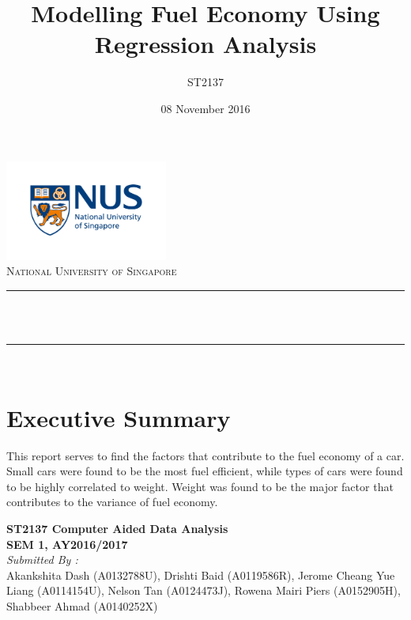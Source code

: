 \documentclass[12pt]{article}
\title{Modelling Fuel Economy Using Regression Analysis}					%
\author{ST2137}							%
\date{08 November 2016}							%
\makeatletter
\let\thetitle\@title
\makeatother
\begin{document}
\doublespacing



\begin{titlepage}
	\centering
    \includegraphics[width = 0.4\textwidth]{logo1.jpg}\\[0.4cm]	%
    \textsc{ National University of Singapore}\\[0.2 cm]	%
	\rule{\linewidth}{0.2 mm} \\[0.1 cm]
	{ \huge \bfseries \thetitle}\\
	\rule{\linewidth}{0.2 mm} \\[0.2 cm]
	
\section*{Executive Summary}
This report serves to find the factors that contribute to the fuel economy of a car. Small cars were found to be the most fuel efficient, while types of cars were found to be highly correlated to weight. Weight was found to be the major factor that contributes to the variance of fuel economy. 	
	 
			\begin{center} 
			\textbf { ST2137 Computer Aided Data Analysis\\SEM 1, AY2016/2017}\\[0.7cm]
			\emph{Submitted By :}\\[0.1cm]
        Akankshita Dash (A0132788U), Drishti Baid (A0119586R), Jerome Cheang Yue Liang (A0114154U), Nelson Tan (A0124473J), Rowena Mairi Piers (A0152905H), Shabbeer Ahmad (A0140252X)\\[0.1cm] 
		    \end{center}
        


\end{titlepage}

\end{document}

